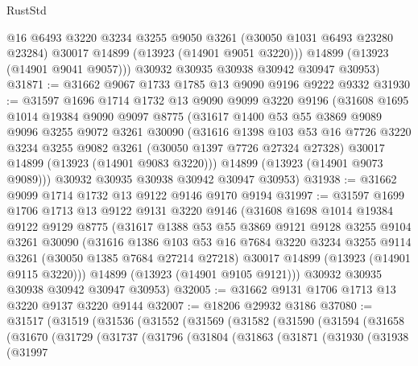 \begin{lexlean}{RustStd}
\begin{coremodule}
          @16
          @6493
          @3220
          @3234
          @3255
          @9050
          @3261
          (@30050 @1031 @6493 @23280 @23284)
          @30017
          @14899
          (@13923 (@14901 @9051 @3220)))
        @14899
        (@13923 (@14901 @9041 @9057)))
      @30932
      @30935
      @30938
      @30942
      @30947
      @30953)
@31871 := @31662 @9067 @1733 @1785 @13 @9090 @9196 @9222 @9332
@31930 := @31597
    @1696
    @1714
    @1732
    @13
    @9090
    @9099
    @3220
    @9196
    (@31608
      @1695
      @1014
      @19384
      @9090
      @9097
      @8775
      (@31617
        @1400
        @53
        @55
        @3869
        @9089
        @9096
        @3255
        @9072
        @3261
        @30090
        (@31616
          @1398
          @103
          @53
          @16
          @7726
          @3220
          @3234
          @3255
          @9082
          @3261
          (@30050 @1397 @7726 @27324 @27328)
          @30017
          @14899
          (@13923 (@14901 @9083 @3220)))
        @14899
        (@13923 (@14901 @9073 @9089)))
      @30932
      @30935
      @30938
      @30942
      @30947
      @30953)
@31938 := @31662 @9099 @1714 @1732 @13 @9122 @9146 @9170 @9194
@31997 := @31597
    @1699
    @1706
    @1713
    @13
    @9122
    @9131
    @3220
    @9146
    (@31608
      @1698
      @1014
      @19384
      @9122
      @9129
      @8775
      (@31617
        @1388
        @53
        @55
        @3869
        @9121
        @9128
        @3255
        @9104
        @3261
        @30090
        (@31616
          @1386
          @103
          @53
          @16
          @7684
          @3220
          @3234
          @3255
          @9114
          @3261
          (@30050 @1385 @7684 @27214 @27218)
          @30017
          @14899
          (@13923 (@14901 @9115 @3220)))
        @14899
        (@13923 (@14901 @9105 @9121)))
      @30932
      @30935
      @30938
      @30942
      @30947
      @30953)
@32005 := @31662 @9131 @1706 @1713 @13 @3220 @9137 @3220 @9144
@32007 := @18206 @29932 @3186
@37080 := @31517
    (@31519
      (@31536
        (@31552
          (@31569
            (@31582
              (@31590
                (@31594
                  (@31658
                    (@31670
                      (@31729
                        (@31737
                          (@31796
                            (@31804
                              (@31863
                                (@31871
                                  (@31930
                                    (@31938
                                      (@31997

\end{coremodule}
\end{lexlean}
